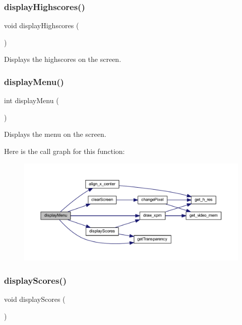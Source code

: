 \subsubsection{\texorpdfstring{displayHighscores()}{displayHighscores()}}
{\footnotesize\ttfamily void display\+Highscores (\begin{DoxyParamCaption}{ }\end{DoxyParamCaption})}



Displays the highscores on the screen. 

\mbox{\label{group__menu_gaad9ed7a055a99883645739e4bfca0e5e}} 
\subsubsection{\texorpdfstring{displayMenu()}{displayMenu()}}
{\footnotesize\ttfamily int display\+Menu (\begin{DoxyParamCaption}{ }\end{DoxyParamCaption})}



Displays the menu on the screen. 

Here is the call graph for this function\+:
\nopagebreak
\begin{figure}[H]
\begin{center}
\leavevmode
\includegraphics[width=350pt]{group__menu_gaad9ed7a055a99883645739e4bfca0e5e_cgraph}
\end{center}
\end{figure}
\mbox{\label{group__menu_ga4e67dd36352ce9409d1994cad2553089}} 
\subsubsection{\texorpdfstring{displayScores()}{displayScores()}}
{\footnotesize\ttfamily void display\+Scores (\begin{DoxyParamCaption}{ }\end{DoxyParamCaption})}



